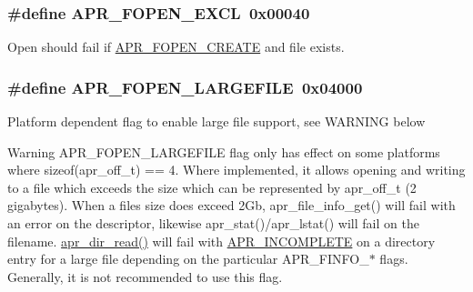 \subsubsection[{\texorpdfstring{A\+P\+R\+\_\+\+F\+O\+P\+E\+N\+\_\+\+E\+X\+CL}{APR_FOPEN_EXCL}}]{\setlength{\rightskip}{0pt plus 5cm}\#define A\+P\+R\+\_\+\+F\+O\+P\+E\+N\+\_\+\+E\+X\+CL~0x00040}\hypertarget{group__apr__file__open__flags_gabb7fb062cdf1d58faee8c7ea518496f1}{}\label{group__apr__file__open__flags_gabb7fb062cdf1d58faee8c7ea518496f1}
Open should fail if \hyperlink{group__apr__file__open__flags_gafe94f21ccbf411172e70e7f473af251a}{A\+P\+R\+\_\+\+F\+O\+P\+E\+N\+\_\+\+C\+R\+E\+A\+TE} and file exists. 
\subsubsection[{\texorpdfstring{A\+P\+R\+\_\+\+F\+O\+P\+E\+N\+\_\+\+L\+A\+R\+G\+E\+F\+I\+LE}{APR_FOPEN_LARGEFILE}}]{\setlength{\rightskip}{0pt plus 5cm}\#define A\+P\+R\+\_\+\+F\+O\+P\+E\+N\+\_\+\+L\+A\+R\+G\+E\+F\+I\+LE~0x04000}\hypertarget{group__apr__file__open__flags_gaf6cfaa4789e6264afd186235f0adbc22}{}\label{group__apr__file__open__flags_gaf6cfaa4789e6264afd186235f0adbc22}
Platform dependent flag to enable large file support, see W\+A\+R\+N\+I\+NG below

\begin{DoxyWarning}{Warning}
A\+P\+R\+\_\+\+F\+O\+P\+E\+N\+\_\+\+L\+A\+R\+G\+E\+F\+I\+LE flag only has effect on some platforms where sizeof(apr\+\_\+off\+\_\+t) == 4. Where implemented, it allows opening and writing to a file which exceeds the size which can be represented by apr\+\_\+off\+\_\+t (2 gigabytes). When a file\textquotesingle{}s size does exceed 2\+Gb, apr\+\_\+file\+\_\+info\+\_\+get() will fail with an error on the descriptor, likewise apr\+\_\+stat()/apr\+\_\+lstat() will fail on the filename. \hyperlink{unix_2dir_8c_a3e4ee253e0c712160bee10bfb9c8e4a8}{apr\+\_\+dir\+\_\+read()} will fail with \hyperlink{group__APR__Error_ga64dff43b83bcefd3f3c751be6b864ca1}{A\+P\+R\+\_\+\+I\+N\+C\+O\+M\+P\+L\+E\+TE} on a directory entry for a large file depending on the particular A\+P\+R\+\_\+\+F\+I\+N\+F\+O\+\_\+$\ast$ flags. Generally, it is not recommended to use this flag. 
\end{DoxyWarning}
